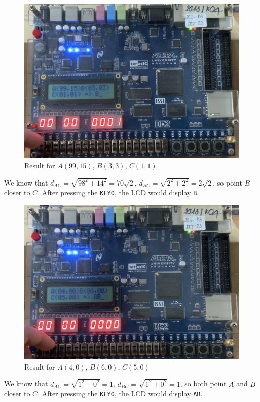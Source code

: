 \documentclass[12pt,a4paper,oneside]{book} %
\begin{document}
 \begin{figure}[H]
    \begin{center}
    \includegraphics[width=.8\textwidth]{images/timer6.jpg}
    \caption{Result for $A(99,15)$, $B(3,3)$, $C(1,1)$}
    \end{center}
\end{figure}
We know that $d_{AC} = \sqrt{98^2 + 14^2} = 70 \sqrt{2}$, $d_{BC} = \sqrt{2^2 + 2^2} = 2 \sqrt{2}$, so point $B$ closer to $C$. After pressing the \texttt{KEY0}, the LCD would display \texttt{B}.

 \begin{figure}[H]
    \begin{center}
    \includegraphics[width=.8\textwidth]{images/timer4.jpg}
    \caption{Result for $A(4,0)$, $B(6,0)$, $C(5,0)$}
    \end{center}
\end{figure}
We know that $d_{AC} = \sqrt{1^2 + 0^2} = 1$, $d_{BC} = \sqrt{1^2 + 0^2} = 1$, so both point $A$ and $B$ closer to $C$. After pressing the \texttt{KEY0}, the LCD would display \texttt{AB}.
\end{document}
